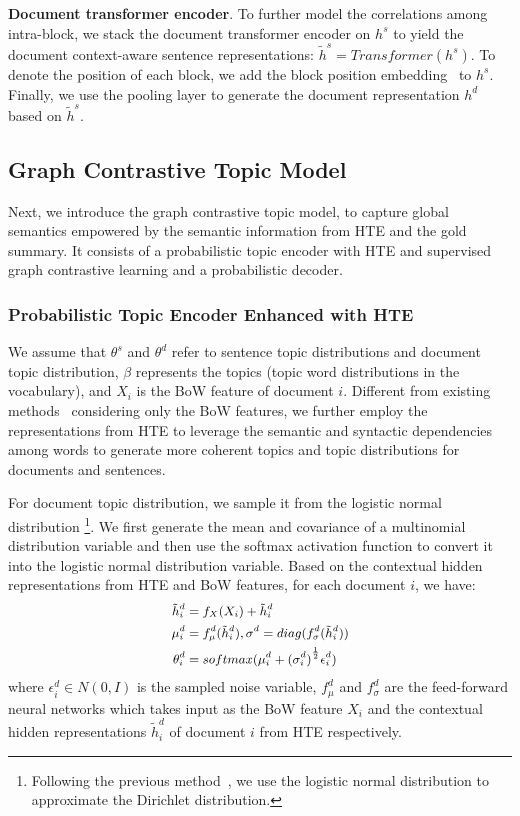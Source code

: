 \documentclass[11pt]{article}
\begin{document}
\textbf{Document transformer encoder}. To further model the correlations among intra-block, we stack the document transformer encoder on $h^s$ to yield the document context-aware sentence representations: $\tilde{h}^s = Transformer(h^s)$.
To denote the position of each block, we add the block position embedding~\cite{vaswani2017attention} to $h^s$.
Finally, we use the pooling layer to generate the document representation $h^d$ based on $\tilde{h}^s$.

\subsection{Graph Contrastive Topic Model}
Next, we introduce the graph contrastive topic model, to capture global semantics empowered by the semantic information from HTE and the gold summary. 
It consists of a probabilistic topic encoder with HTE and supervised graph contrastive learning and a probabilistic decoder.


\subsubsection{Probabilistic Topic Encoder Enhanced with HTE}
We assume that $\theta^s$ and $\theta^d$ refer to sentence topic distributions and document topic distribution, $\beta$ represents the topics (topic word distributions in the vocabulary), and $X_i$ is the BoW feature of document $i$.
Different from existing methods~\cite{wang2020friendly, aralikatte2021focus, fu2020document} considering only the BoW features, we further employ the representations from HTE to leverage the semantic and syntactic dependencies among words to generate more coherent topics and topic distributions for documents and sentences.

For document topic distribution, we sample it from the logistic normal distribution \footnote{\scriptsize Following the previous method~\cite{srivastava2017autoencoding}, we use the logistic normal distribution to approximate the Dirichlet distribution.}. 
We first generate the mean and covariance of a multinomial distribution variable and then use the softmax activation function to convert it into the logistic normal distribution variable. 
Based on the contextual hidden representations from HTE and BoW features, for each document $i$, we have:
\begin{equation}
\small
\begin{split}
\tilde{h}^d_i &= f_{X}(X_i)+\tilde{h}^d_i\\
\mu^d_i &= f_{\mu}^d(\tilde{h}^d_i), \sigma^d = diag(f_{\sigma}^d(\tilde{h}^d_i ))\\
\theta^d_i &= softmax(\mu^d_i + {(\sigma^d_i)}^{\frac{1}{2}}\epsilon^d_i)\\
\label{eq:1}
\end{split}
\end{equation}
where $\epsilon^d_i \in N(0, I)$ is the sampled noise variable, ${f}_{\mu}^d$ and ${f}_{\sigma}^d$ are the feed-forward neural networks which takes input as the BoW feature $X_i$ and the contextual hidden representations $\tilde{h}^d_i$ of document $i$ from HTE respectively.
\end{document}
